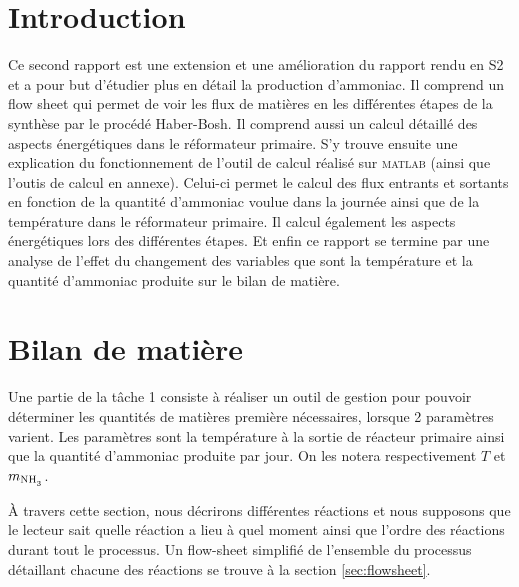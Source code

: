 




\section{Introduction}

Ce second rapport est une extension et une amélioration du rapport rendu 
en S2 et a pour but d'étudier plus en détail la production d'ammoniac. 
Il comprend un flow sheet qui permet de voir les flux de matières en 
les différentes étapes de la synthèse par le procédé Haber-Bosh. 
Il comprend aussi un calcul détaillé des aspects énergétiques dans le réformateur primaire.
S’y trouve ensuite une explication du fonctionnement de l’outil de calcul
réalisé sur \textsc{matlab} (ainsi que l'outis de calcul en annexe).
Celui-ci permet le calcul des flux entrants et sortants en fonction 
de la quantité d'ammoniac voulue dans la journée ainsi que de la 
température dans le réformateur primaire. Il calcul également les aspects énergétiques 
lors des différentes étapes. 
Et enfin ce rapport se termine par une analyse de l'effet du changement 
des variables que sont la température et la quantité d'ammoniac produite 
sur le bilan de matière.

\section{Bilan de matière}
\label{sec:bilan_matiere}

Une partie de la t\^ache 1 consiste à réaliser un outil de gestion
pour pouvoir déterminer les quantités de matières première nécessaires,
lorsque 2 paramètres varient. 
Les paramètres sont la température à la sortie de réacteur primaire ainsi
que la quantité d'ammoniac produite par jour. 
On les notera respectivement $T$ et $m_{\ce{NH3}}$.

À travers cette section, nous décrirons différentes réactions et nous 
supposons que le lecteur sait quelle réaction a lieu à quel moment ainsi 
que l'ordre des réactions durant tout le processus.
Un flow-sheet simplifié de l'ensemble du processus détaillant chacune
des réactions se trouve à la section \ref{sec:flowsheet}.

